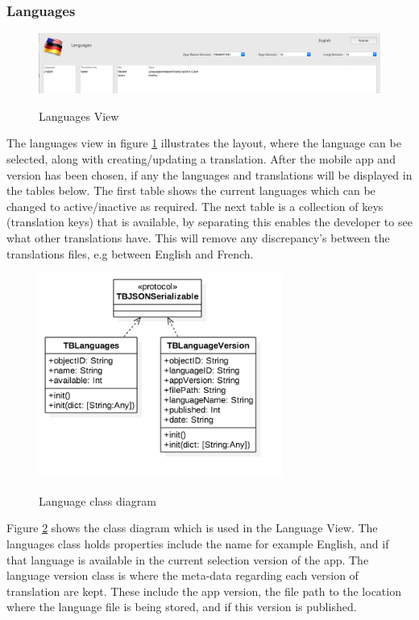 \subsubsection{Languages}

\begin{figure}[!h]
    \caption{Languages View}
    \centering
    \includegraphics[width=120mm]{images/dashboard/languages}
    \label{fig:languages}
\end{figure} 

The languages view in figure \ref{fig:languages} illustrates the layout, where the language can be selected, along with creating/updating a translation. After the mobile app and version has been chosen, if any the languages and translations will be displayed in the tables below. The first table shows the current languages which can be changed to active/inactive as required. The next table is a collection of keys (translation keys) that is available, by separating this enables the developer to see what other translations have. This will remove any discrepancy's between the translations files, e.g between English and French.

\begin{figure}[!h]
    \caption{Language class diagram}
    \centering
    \includegraphics[width=80mm]{images/classdiagrams/lang_class}
    \label{fig:lang_class}
\end{figure}

Figure \ref{fig:lang_class} shows the class diagram which is used in the Language View. The languages class holds properties include the name for example English, and if that language is available in the current selection version of the app. The language version class is where the meta-data regarding each version of translation are kept. These include the app version, the file path to the location where the language file is being stored, and if this version is published.

